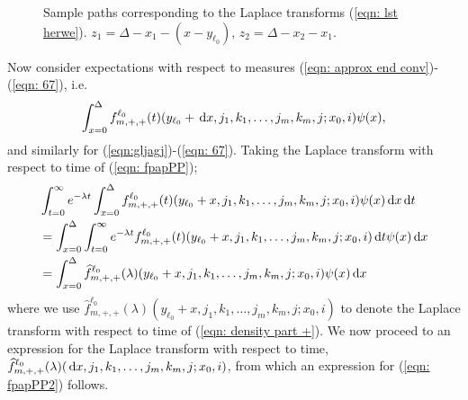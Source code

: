 \begin{figure}
    \caption{\label{fig: sample paths lst} Sample paths corresponding to the Laplace transforms (\ref{eqn: lst herwe}). \(z_1 = \Delta - x_1-(x-y_{\ell_0}),\, z_2= \Delta - x_2-x_1\).}
\end{figure}

Now consider expectations with respect to measures (\ref{eqn: approx end conv})-(\ref{eqn: 67}), i.e. 
\begin{align}
	\int_{x=0}^\Delta f^{\ell_0}_{m,+,+}(t)( y_{\ell_0} + \, \mathrm{d} x, j_1,k_1,\dots,j_m,k_m, j; x_0,i) \psi(x), \label{eqn: fpapPP}
\end{align}
and similarly for (\ref{eqn:gljagj})-(\ref{eqn: 67}). Taking the Laplace transform with respect to time of (\ref{eqn: fpapPP});
\begin{align}
	&\int_{t=0}^\infty e^{-\lambda t}\int_{x=0}^\Delta f^{\ell_0}_{m,+,+}(t)( y_{\ell_0} + x, j_1,k_1,\dots,j_m,k_m, j; x_0,i) \psi(x)\, \mathrm{d} x \, \mathrm{d} t \nonumber 
	\\&= \int_{x=0}^\Delta \int_{t=0}^\infty e^{-\lambda t} f^{\ell_0}_{m,+,+}(t)( y_{\ell_0} + x, j_1,k_1,\dots,j_m,k_m, j; x_0,i)  \, \mathrm{d} t \psi(x) \, \mathrm{d} x \nonumber 
	\\&= \int_{x=0}^\Delta \widehat f^{\ell_0}_{m,+,+}(\lambda)( y_{\ell_0} + x, j_1,k_1,\dots,j_m,k_m, j; x_0,i) \psi(x) \, \mathrm{d} x \label{eqn: fpapPP2}
\end{align}
where we use \(\widehat f^{\ell_0}_{m,+,+}(\lambda)( y_{\ell_0} + x, j_1,k_1,\dots,j_m,k_m, j; x_0,i) \) to denote the Laplace transform with respect to time of (\ref{eqn: density part +}). We now proceed to an expression for the Laplace transform with respect to time, \(\widehat f^{\ell_0}_{m,+,+}(\lambda)( \, \mathrm{d} x, j_1,k_1,\dots,j_m,k_m, j; x_0,i) \), from which an expression for (\ref{eqn: fpapPP2}) follows. 


